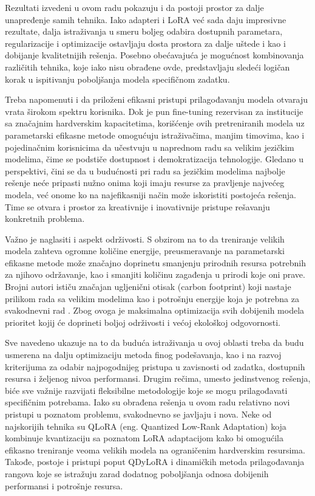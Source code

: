 \documentclass[12pt,oneside]{memoir}
\begin{document}
Rezultati izvedeni u ovom radu pokazuju i da postoji prostor za dalje unapređenje samih tehnika. Iako adapteri i LoRA već sada daju impresivne rezultate, dalja istraživanja u smeru boljeg odabira dostupnih parametara, regularizacije i optimizacije ostavljaju dosta prostora za dalje uštede i kao i dobijanje kvalitetnijih rešenja. Posebno obećavajuća je mogućnost kombinovanja različitih tehnika, koje iako nisu obrađene ovde, predstavljaju sledeći logičan korak u ispitivanju poboljšanja modela specifičnom zadatku.

Treba napomenuti i da priloženi efikasni pristupi prilagođavanju modela otvaraju vrata širokom spektru korisnika. Dok je pun fine-tuning rezervisan za institucije sa značajnim hardverskim kapacitetima, korišćenje ovih pretreniranih modela uz parametarski efikasne metode omogućuju istraživačima, manjim timovima, kao i pojedinačnim korisnicima da učestvuju u naprednom radu sa velikim jezičkim modelima, čime se podstiče dostupnost i demokratizacija tehnologije. Gledano u perspektivi, čini se da u budućnosti pri radu sa jezičkim modelima najbolje rešenje neće pripasti nužno onima koji imaju resurse za pravljenje najvećeg modela, već onome ko na najefikasniji način može iskoristiti postojeća rešenja. Time se otvara i prostor za kreativnije i inovativnije pristupe rešavanju konkretnih problema.

Važno je naglasiti i aspekt održivosti. S obzirom na to da treniranje velikih modela zahteva ogromne količine energije, preusmeravanje na parametarski efikasne metode može značajno doprinetu smanjenju prirodnih resursa potrebnih za njihovo održavanje, kao i smanjiti količinu zagađenja u prirodi koje oni prave. Brojni autori ističu značajan ugljenični otisak (carbon footprint) koji nastaje prilikom rada sa velikim modelima kao i potrošnju energije koja je potrebna za svakodnevni rad \cite{LLMCarbonFootprint}. Zbog ovoga je maksimalna optimizacija svih dobijenih modela prioritet kojij će doprineti boljoj održivosti i većoj ekološkoj odgovornosti.

Sve navedeno ukazuje na to da buduća istraživanja u ovoj oblasti treba da budu usmerena na dalju optimizaciju metoda finog podešavanja, kao i na razvoj kriterijuma za odabir najpogodnijeg pristupa u zavisnosti od zadatka, dostupnih resursa i željenog nivoa performansi. Drugim rečima, umesto jedinstvenog rešenja, biće sve važnije razvijati fleksibilne metodologije koje se mogu prilagođavati specifičnim potrebama. Iako su obrađena rešenja u ovom radu relativno novi pristupi u poznatom problemu, svakodnevno se javljaju i nova. Neke od najskorijih tehnika su QLoRA (eng. Quantized Low-Rank Adaptation)\cite{2023dettmersQLora} koja kombinuje kvantizaciju sa poznatom LoRA adaptacijom kako bi omogućila efikasno treniranje veoma velikih modela na ograničenim hardverskim resursima. Takođe, postoje i pristupi poput QDyLoRA i dinamičkih metoda prilagođavanja rangova \cite{2024qdylora} koje se istražuju zarad dodatnog poboljšanja odnosa dobijenih performansi i potrošnje resursa. 
\end{document}

